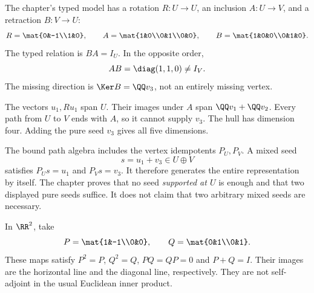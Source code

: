 
The chapter's typed model has a rotation $R:U\to U$, an inclusion $A:U\to V$, and a retraction $B:V\to U$:
\[
R=\mat{0&-1\\1&0},\qquad
A=\mat{1&0\\0&1\\0&0},\qquad
B=\mat{1&0&0\\0&1&0}.
\]
The typed relation is $BA=I_U$. In the opposite order,
\[
AB=\diag(1,1,0)\ne I_V.
\]
The missing direction is $\Ker B=\QQ v_3$, not an entirely missing vertex.


The vectors $u_1,Ru_1$ span $U$. Their images under $A$ span $\QQ v_1+\QQ v_2$. Every path from $U$ to $V$ ends with $A$, so it cannot supply $v_3$. The hull has dimension four. Adding the pure seed $v_3$ gives all five dimensions.

The bound path algebra includes the vertex idempotents $P_U,P_V$. A mixed seed
\[
s=u_1+v_3\in U\oplus V
\]
satisfies $P_Us=u_1$ and $P_Vs=v_3$. It therefore generates the entire representation by itself. The chapter proves that no seed \emph{supported at $U$} is enough and that two displayed pure seeds suffice. It does not claim that two arbitrary mixed seeds are necessary.


In $\RR^2$, take
\[
P=\mat{1&-1\\0&0},\qquad Q=\mat{0&1\\0&1}.
\]
These maps satisfy $P^2=P$, $Q^2=Q$, $PQ=QP=0$ and $P+Q=I$. Their images are the horizontal line and the diagonal line, respectively. They are not self-adjoint in the usual Euclidean inner product.

